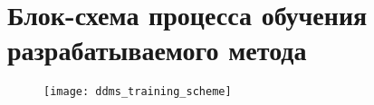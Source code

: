 \chapter{Блок-схема процесса обучения разрабатываемого метода}
\label{app:DDMS:TrainingScheme}
\begin{figure}[H]
\texttt{[image: ddms\_training\_scheme]}
\end{figure}